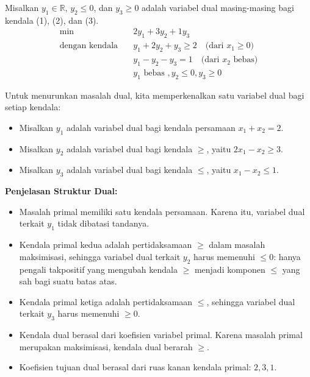 \medskip

\begin{tcolorbox}[title=Dual (D), colback=green!5, colframe=green!60!black, sharp corners=south]
Misalkan \( y_1 \in \mathbb{R} \), \( y_2 \leq 0 \), dan \( y_3 \geq 0 \) adalah variabel dual masing-masing bagi kendala (1), (2), dan (3).
\[
\begin{aligned}
\min\quad & 2y_1 + 3y_2 + 1y_3 \\
\text{dengan kendala} \quad
& y_1 + 2y_2 + y_3 \geq 2 \quad \text{(dari } x_1 \geq 0\text{)} \\
& y_1 - y_2 - y_3 = 1 \quad \text{(dari } x_2 \text{ bebas)}\\
& y_1  \text{ bebas } , y_2 \leq 0 , y_3 \geq 0
\end{aligned}
\]
\end{tcolorbox}
\par

Untuk menurunkan masalah dual, kita memperkenalkan satu variabel dual bagi setiap kendala:
\begin{itemize}
    \item Misalkan \( y_1 \) adalah variabel dual bagi kendala persamaan \( x_1 + x_2 = 2 \).
    \item Misalkan \( y_2 \) adalah variabel dual bagi kendala \( \geq \), yaitu \( 2x_1 - x_2 \geq 3 \).
    \item Misalkan \( y_3 \) adalah variabel dual bagi kendala \( \leq \), yaitu \( x_1 - x_2 \leq 1 \).
\end{itemize}

\textbf{Penjelasan Struktur Dual:}
\begin{itemize}
    \item Masalah primal memiliki satu kendala persamaan. Karena itu, variabel dual terkait \( y_1 \) tidak dibatasi tandanya.
    \item Kendala primal kedua adalah pertidaksamaan \( \geq \) dalam masalah maksimisasi, sehingga variabel dual terkait \( y_2 \) harus memenuhi \( \leq 0 \): hanya pengali takpositif yang mengubah kendala \( \geq \) menjadi komponen \( \leq \) yang sah bagi suatu batas atas.
    \item Kendala primal ketiga adalah pertidaksamaan \( \leq \), sehingga variabel dual terkait \( y_3 \) harus memenuhi \( \geq 0 \).
    \item Kendala dual berasal dari koefisien variabel primal. Karena masalah primal merupakan maksimisasi, kendala dual berarah \( \geq \).
    \item Koefisien tujuan dual berasal dari ruas kanan kendala primal: \( 2, 3, 1 \).
\end{itemize}

